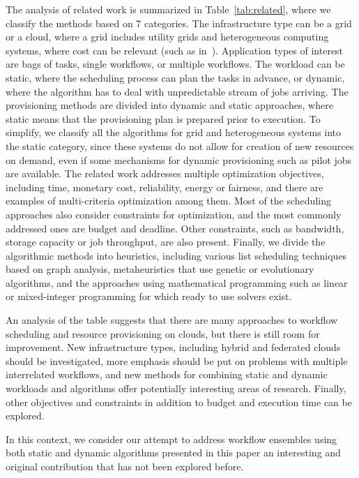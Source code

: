 \documentclass[preprint,5p]{elsarticle}
\begin{document}
The analysis of related work is summarized in Table~\ref{tab:related}, where we classify the methods based on 7 categories. 
The infrastructure type can be a grid or a cloud, where a grid includes utility grids 
and heterogeneous computing systems, where cost can be relevant (such as in~\cite{Sakellariou2007}). 
Application types of interest are bags of tasks, single workflows, or multiple workflows. 
The workload can be static, where the scheduling process can plan the tasks in advance, 
or dynamic, where the algorithm has to deal with unpredictable stream of jobs arriving. 
The provisioning methods are divided into dynamic and static approaches, 
where static means that the provisioning plan is prepared prior to execution. 
To simplify, we classify all the algorithms for grid and heterogeneous systems into the static category, 
since these systems do not allow for creation of new resources on demand, 
even if some mechanisms for dynamic provisioning such as pilot jobs~\cite{Sfiligoi08} are available. 
The related work addresses multiple optimization objectives, 
including time, monetary cost, reliability, energy or fairness, 
and there are examples of multi-criteria optimization among them. 
Most of the scheduling approaches also consider constraints for optimization, 
and the most commonly addressed ones are budget and deadline. 
Other constraints, such as bandwidth, storage capacity or job throughput, are also present. 
Finally, we divide the algorithmic methods into heuristics, 
including various list scheduling techniques based on graph analysis, 
metaheuristics that use genetic or evolutionary algorithms, 
and the approaches using mathematical programming such as linear 
or mixed-integer programming for which ready to use solvers exist.

An analysis of the table suggests that there are many approaches to workflow scheduling 
and resource provisioning on clouds, but there is still room for improvement. 
New infrastructure types, including hybrid and federated clouds should be investigated, 
more emphasis should be put on problems with multiple interrelated workflows, 
and new methods for combining static and dynamic workloads and algorithms offer potentially interesting areas of research. 
Finally, other objectives and constraints in addition to budget and execution time can be explored. 

In this context, we consider our attempt to address workflow ensembles using both static and dynamic algorithms 
presented in this paper an interesting and original contribution that has not been explored before.
\end{document}
